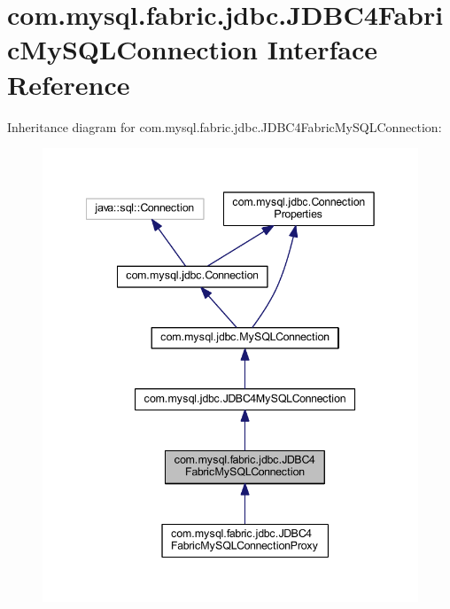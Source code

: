 \hypertarget{interfacecom_1_1mysql_1_1fabric_1_1jdbc_1_1_j_d_b_c4_fabric_my_s_q_l_connection}{}\section{com.\+mysql.\+fabric.\+jdbc.\+J\+D\+B\+C4\+Fabric\+My\+S\+Q\+L\+Connection Interface Reference}
\label{interfacecom_1_1mysql_1_1fabric_1_1jdbc_1_1_j_d_b_c4_fabric_my_s_q_l_connection}


Inheritance diagram for com.\+mysql.\+fabric.\+jdbc.\+J\+D\+B\+C4\+Fabric\+My\+S\+Q\+L\+Connection\+:\nopagebreak
\begin{figure}[H]
\begin{center}
\leavevmode
\includegraphics[width=342pt]{interfacecom_1_1mysql_1_1fabric_1_1jdbc_1_1_j_d_b_c4_fabric_my_s_q_l_connection__inherit__graph}
\end{center}
\end{figure}


